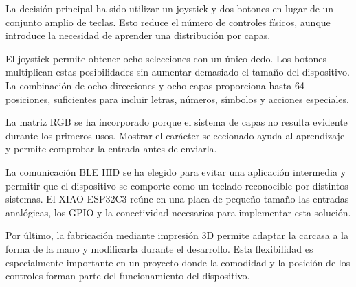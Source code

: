 La decisión principal ha sido utilizar un joystick y dos botones en lugar de un conjunto amplio de teclas. Esto reduce el número de controles físicos, aunque introduce la necesidad de aprender una distribución por capas.

El joystick permite obtener ocho selecciones con un único dedo. Los botones multiplican estas posibilidades sin aumentar demasiado el tamaño del dispositivo. La combinación de ocho direcciones y ocho capas proporciona hasta 64 posiciones, suficientes para incluir letras, números, símbolos y acciones especiales.

La matriz RGB se ha incorporado porque el sistema de capas no resulta evidente durante los primeros usos. Mostrar el carácter seleccionado ayuda al aprendizaje y permite comprobar la entrada antes de enviarla.

La comunicación BLE HID se ha elegido para evitar una aplicación intermedia y permitir que el dispositivo se comporte como un teclado reconocible por distintos sistemas. El XIAO ESP32C3 reúne en una placa de pequeño tamaño las entradas analógicas, los GPIO y la conectividad necesarios para implementar esta solución.

Por último, la fabricación mediante impresión 3D permite adaptar la carcasa a la forma de la mano y modificarla durante el desarrollo. Esta flexibilidad es especialmente importante en un proyecto donde la comodidad y la posición de los controles forman parte del funcionamiento del dispositivo.
